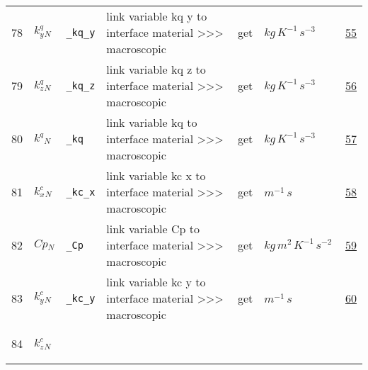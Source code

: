 \begin{longtable}{|p{1cm}|p{2.5cm}|p{4.5cm}|p{8cm}|p{3.0cm}|p{3cm}|p{1cm}|}
    78
             & \hypertarget{"v:78"}{ $ {{k^q_y}}{_{N}} $}
             & \verb|_kq_y|
             & link variable kq y to interface material >>> macroscopic
             & \begin{lay}get \end{lay}
             & $ kg \,K^{-1} \,s^{-3} \, $
             & \hyperlink{"e:55"}{ 55 }
                 \\
    79
             & \hypertarget{"v:79"}{ $ {{k^q_z}}{_{N}} $}
             & \verb|_kq_z|
             & link variable kq z to interface material >>> macroscopic
             & \begin{lay}get \end{lay}
             & $ kg \,K^{-1} \,s^{-3} \, $
             & \hyperlink{"e:56"}{ 56 }
                 \\
    80
             & \hypertarget{"v:80"}{ $ {{k^q}}{_{N}} $}
             & \verb|_kq|
             & link variable kq to interface material >>> macroscopic
             & \begin{lay}get \end{lay}
             & $ kg \,K^{-1} \,s^{-3} \, $
             & \hyperlink{"e:57"}{ 57 }
                 \\
    81
             & \hypertarget{"v:81"}{ $ {{k^c_x}}{_{N}} $}
             & \verb|_kc_x|
             & link variable kc x to interface material >>> macroscopic
             & \begin{lay}get \end{lay}
             & $ m^{-1} \,s \, $
             & \hyperlink{"e:58"}{ 58 }
                 \\
    82
             & \hypertarget{"v:82"}{ $ {Cp}{_{N}} $}
             & \verb|_Cp|
             & link variable Cp to interface material >>> macroscopic
             & \begin{lay}get \end{lay}
             & $ kg \,m^{2} \,K^{-1} \,s^{-2} \, $
             & \hyperlink{"e:59"}{ 59 }
                 \\
    83
             & \hypertarget{"v:83"}{ $ {{k^c_y}}{_{N}} $}
             & \verb|_kc_y|
             & link variable kc y to interface material >>> macroscopic
             & \begin{lay}get \end{lay}
             & $ m^{-1} \,s \, $
             & \hyperlink{"e:60"}{ 60 }
                 \\
    84
             & \hypertarget{"v:84"}{ $ {{k^c_z}}{_{N}} $}

\end{longtable}
